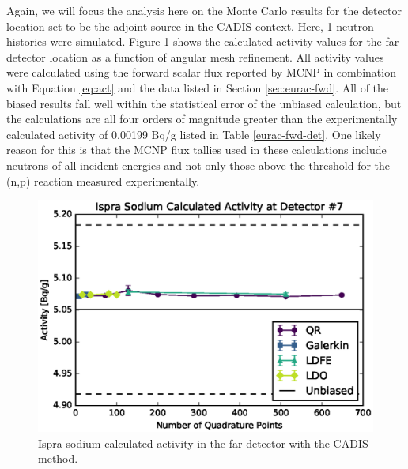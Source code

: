 Again, we will focus the analysis here on
the Monte Carlo results for the detector location set to be the adjoint source in the
CADIS context. Here, 1 neutron histories were simulated. 
Figure \ref{eurac-cad-tally} shows the calculated activity values for
the far detector location as a function of angular mesh refinement. All activity
values were calculated using the forward scalar flux reported by MCNP in combination
with Equation \ref{eq:act} and the data listed in Section \ref{sec:eurac-fwd}. All of
the biased results fall well within the statistical error of the unbiased calculation,
but the calculations are all four orders of magnitude greater than the experimentally
calculated activity of 0.00199 Bq/g listed in Table \ref{eurac-fwd-det}. One likely
reason for this is that the MCNP flux tallies used in these calculations include neutrons of 
all incident energies and not only those above the threshold for the (n,p)
reaction measured experimentally.

\begin{figure}[!htb]
\centering
\includegraphics[max height=0.445\textheight]{img/eurac-plots/mcnp/cadis-tally-74.eps}
\caption{Ispra sodium calculated activity in the far detector with the CADIS method.}
\label{eurac-cad-tally}
\end{figure}

